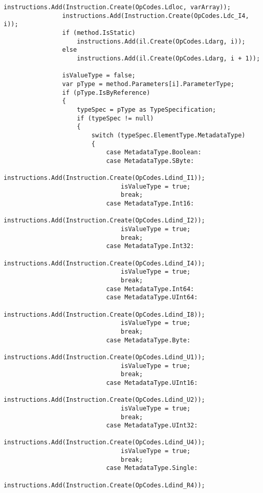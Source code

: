 \begin{lstlisting}[caption={../buffalo/Extensions/Extensions.cs}, label=../buffalo/Extensions/Extensions.cs, frame=tb, basicstyle=\scriptsize]
                instructions.Add(Instruction.Create(OpCodes.Ldloc, varArray));
                instructions.Add(Instruction.Create(OpCodes.Ldc_I4, i));
                if (method.IsStatic)
                    instructions.Add(il.Create(OpCodes.Ldarg, i));
                else
                    instructions.Add(il.Create(OpCodes.Ldarg, i + 1));

                isValueType = false;
                var pType = method.Parameters[i].ParameterType;
                if (pType.IsByReference)
                {
                    typeSpec = pType as TypeSpecification;
                    if (typeSpec != null)
                    {
                        switch (typeSpec.ElementType.MetadataType)
                        {
                            case MetadataType.Boolean:
                            case MetadataType.SByte:
                                instructions.Add(Instruction.Create(OpCodes.Ldind_I1)); 
                                isValueType = true;
                                break;
                            case MetadataType.Int16:
                                instructions.Add(Instruction.Create(OpCodes.Ldind_I2)); 
                                isValueType = true;
                                break;
                            case MetadataType.Int32:
                                instructions.Add(Instruction.Create(OpCodes.Ldind_I4)); 
                                isValueType = true;
                                break;
                            case MetadataType.Int64:
                            case MetadataType.UInt64:
                                instructions.Add(Instruction.Create(OpCodes.Ldind_I8)); 
                                isValueType = true;
                                break;
                            case MetadataType.Byte:
                                instructions.Add(Instruction.Create(OpCodes.Ldind_U1)); 
                                isValueType = true;
                                break;
                            case MetadataType.UInt16:
                                instructions.Add(Instruction.Create(OpCodes.Ldind_U2)); 
                                isValueType = true;
                                break;
                            case MetadataType.UInt32:
                                instructions.Add(Instruction.Create(OpCodes.Ldind_U4)); 
                                isValueType = true;
                                break;
                            case MetadataType.Single:
                                instructions.Add(Instruction.Create(OpCodes.Ldind_R4));

\end{lstlisting}
